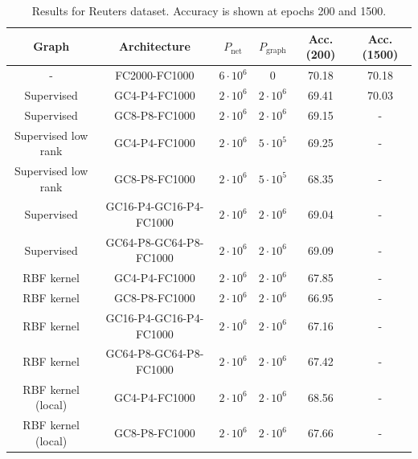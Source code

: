 \begin{table}[H]
\caption{Results for Reuters dataset. Accuracy is shown at epochs 200 and 1500.}
\begin{center}
\begin{tabular}{|c|c|c|c|c|c|}
\hline
Graph & Architecture & $P_\text{net}$ & $P_\text{graph}$ & Acc. (200) & Acc. (1500)\\
\hline
- &FC2000-FC1000 & $6 \cdot 10^6$ & 0 &70.18 \footnotemark & 70.18 \\
Supervised & GC4-P4-FC1000 & $2\cdot 10^6$ & $2 \cdot 10^6$ & 69.41 & 70.03 \\
Supervised & GC8-P8-FC1000 & $2 \cdot 10^6$ & $2 \cdot 10^6$ & 69.15 & - \\
Supervised low rank & GC4-P4-FC1000 & $2\cdot 10^6$ & $5 \cdot 10^5$ & 69.25 & - \\
Supervised low rank & GC8-P8-FC1000 & $2 \cdot 10^6$ & $5 \cdot 10^5$ & 68.35 & - \\
Supervised & GC16-P4-GC16-P4-FC1000& $2 \cdot 10^6$ & $2 \cdot 10^6$ & 69.04 & - \\
Supervised &GC64-P8-GC64-P8-FC1000 & $2 \cdot 10^6$ & $2 \cdot 10^6$ & 69.09 & - \\
RBF kernel & GC4-P4-FC1000 & $2\cdot 10^6$ & $2 \cdot 10^6$ & 67.85 & - \\
RBF kernel & GC8-P8-FC1000 & $2 \cdot 10^6$ & $2 \cdot 10^6$ & 66.95 & - \\
RBF kernel & GC16-P4-GC16-P4-FC1000 & $2 \cdot 10^6$ & $2 \cdot 10^6$ & 67.16 & - \\
RBF kernel & GC64-P8-GC64-P8-FC1000 & $2 \cdot 10^6$ & $2 \cdot 10^6$ & 67.42 & - \\
RBF kernel (local)& GC4-P4-FC1000 & $2\cdot 10^6$ & $2 \cdot 10^6$ & 68.56 & - \\
RBF kernel (local) & GC8-P8-FC1000 & $2 \cdot 10^6$ & $2 \cdot 10^6$ & 67.66 & - \\
\hline
\end{tabular}
\end{center}
\label{reuterstable}
\end{table}

